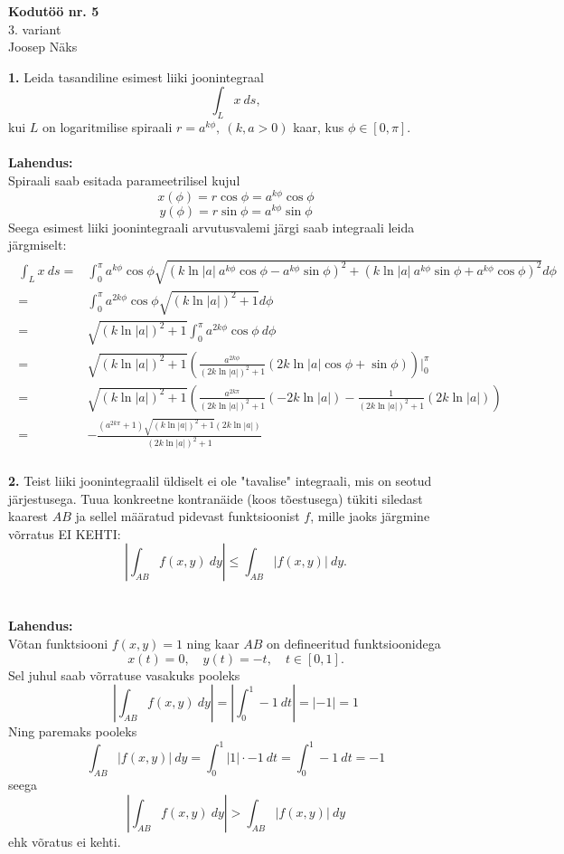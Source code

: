 \documentclass{article}
\begin{document}
\begin{center}
\Large\textbf{Kodutöö nr. 5}\\
3. variant\\
\small{Joosep Näks}
\end{center}
\textbf{1. }Leida tasandiline esimest liiki joonintegraal $$\int_Lx\ ds,$$kui $L$ on logaritmilise spiraali $r=a^{k\phi},\ (k,a>0)$ kaar, kus $\phi\in[0,\pi]$.\\\\
\textbf{Lahendus:}\\
Spiraali saab esitada parameetrilisel kujul $$x(\phi)=r\cos\phi=a^{k\phi}\cos\phi$$$$y(\phi)=r\sin\phi=a^{k\phi}\sin\phi$$ Seega esimest liiki joonintegraali arvutusvalemi järgi saab integraali leida järgmiselt:
\begin{gather*}
\begin{aligned}
\int_Lx\ ds =& \int_0^\pi a^{k\phi}\cos\phi\sqrt{(k\ln|a|\ a^{k\phi}\cos\phi-a^{k\phi}\sin\phi)^2+(k\ln|a|\ a^{k\phi}\sin\phi+a^{k\phi}\cos\phi)^2}d\phi\\
=&\int_0^\pi a^{2k\phi}\cos\phi\sqrt{(k\ln|a|)^2+1}d\phi\\
=&\sqrt{(k\ln|a|)^2+1}\int_0^\pi a^{2k\phi}\cos\phi\ d\phi\\
=&\sqrt{(k\ln|a|)^2+1}\left(\frac{a^{2k\phi}}{(2k\ln|a|)^2+1}(2k\ln|a|\cos\phi+\sin\phi)\right)\Bigg|_0^\pi\\
=&\sqrt{(k\ln|a|)^2+1}\left(\frac{a^{2k\pi}}{(2k\ln|a|)^2+1}(-2k\ln|a|)-\frac{1}{(2k\ln|a|)^2+1}(2k\ln|a|)\right)\\
=&-\frac{(a^{2k\pi}+1)\sqrt{(k\ln|a|)^2+1}(2k\ln|a|)}{(2k\ln|a|)^2+1}
\end{aligned}
\end{gather*}
\pagebreak\\
\textbf{2.} Teist liiki joonintegraalil üldiselt ei ole "tavalise" integraali, mis on seotud järjestusega. Tuua konkreetne kontranäide (koos tõestusega) tükiti siledast kaarest $AB$ ja sellel määratud pidevast funktsioonist $f$, mille jaoks järgmine võrratus EI KEHTI: $$\left|\int_{AB}f(x,y)\ dy\right|\leq\int_{AB}|f(x,y)|\ dy.$$\\\\
\textbf{Lahendus:}\\
Võtan funktsiooni $f(x,y)=1$ ning kaar $AB$ on defineeritud funktsioonidega $$x(t)=0,\quad y(t)=-t,\quad t\in[0,1].$$ Sel juhul saab võrratuse vasakuks pooleks $$\left|\int_{AB}f(x,y)\ dy\right|=\left|\int_0^1-1\ dt\right|=|-1|=1$$ Ning paremaks pooleks $$\int_{AB}|f(x,y)|\ dy=\int_0^1|1|\cdot-1\ dt=\int_0^1-1\ dt=-1$$ seega $$\left|\int_{AB}f(x,y)\ dy\right|>\int_{AB}|f(x,y)|\ dy$$ ehk võratus ei kehti.
\end{document}
